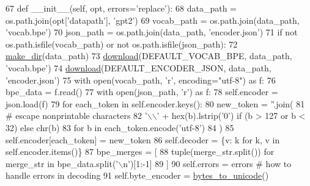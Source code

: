 \begin{DoxyCode}
67     \textcolor{keyword}{def }\_\_init\_\_(self, opt, errors='replace'):
68         data\_path = os.path.join(opt[\textcolor{stringliteral}{'datapath'}], \textcolor{stringliteral}{'gpt2'})
69         vocab\_path = os.path.join(data\_path, \textcolor{stringliteral}{'vocab.bpe'})
70         json\_path = os.path.join(data\_path, \textcolor{stringliteral}{'encoder.json'})
71         \textcolor{keywordflow}{if} \textcolor{keywordflow}{not} os.path.isfile(vocab\_path) \textcolor{keywordflow}{or} \textcolor{keywordflow}{not} os.path.isfile(json\_path):
72             \hyperlink{namespaceparlai_1_1core_1_1build__data_a6ce042fedd4194bd016845bbe7a8facf}{make\_dir}(data\_path)
73             \hyperlink{namespaceparlai_1_1core_1_1build__data_ab74f0e428f05e5d91fa93c8afb367622}{download}(DEFAULT\_VOCAB\_BPE, data\_path, \textcolor{stringliteral}{'vocab.bpe'})
74             \hyperlink{namespaceparlai_1_1core_1_1build__data_ab74f0e428f05e5d91fa93c8afb367622}{download}(DEFAULT\_ENCODER\_JSON, data\_path, \textcolor{stringliteral}{'encoder.json'})
75         with open(vocab\_path, \textcolor{stringliteral}{'r', encoding="utf-8") as f:}
76 \textcolor{stringliteral}{            bpe\_data = f.read()}
77 \textcolor{stringliteral}{        with open(json\_path, 'r') as f:}
78 \textcolor{stringliteral}{            self.encoder = json.load(f)}
79 \textcolor{stringliteral}{        }\textcolor{keywordflow}{for} each\_token \textcolor{keywordflow}{in} self.encoder.keys():
80             new\_token = \textcolor{stringliteral}{''}.join(
81                 \textcolor{comment}{# escape nonprintable characters}
82                 \textcolor{stringliteral}{'\(\backslash\)\(\backslash\)'} + hex(b).lstrip(\textcolor{stringliteral}{'0'}) \textcolor{keywordflow}{if} (b > 127 \textcolor{keywordflow}{or} b < 32) \textcolor{keywordflow}{else} chr(b)
83                 \textcolor{keywordflow}{for} b \textcolor{keywordflow}{in} each\_token.encode(\textcolor{stringliteral}{'utf-8'})
84             )
85             self.encoder[each\_token] = new\_token
86         self.decoder = \{v: k \textcolor{keywordflow}{for} k, v \textcolor{keywordflow}{in} self.encoder.items()\}
87         bpe\_merges = [
88             tuple(merge\_str.split()) \textcolor{keywordflow}{for} merge\_str \textcolor{keywordflow}{in} bpe\_data.split(\textcolor{stringliteral}{'\(\backslash\)n'})[1:-1]
89         ]
90         self.errors = errors  \textcolor{comment}{# how to handle errors in decoding}
91         self.byte\_encoder = \hyperlink{namespaceparlai_1_1core_1_1gpt2__helper_ae992d8ce81708900b1b1bb81bc7a816d}{bytes\_to\_unicode}()

\end{DoxyCode}
